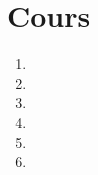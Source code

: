 \section{Cours}
\begin{enumerate}
    \item 
    \item 
    \item 
    \item 
    \item 
    \item 
\end{enumerate}
